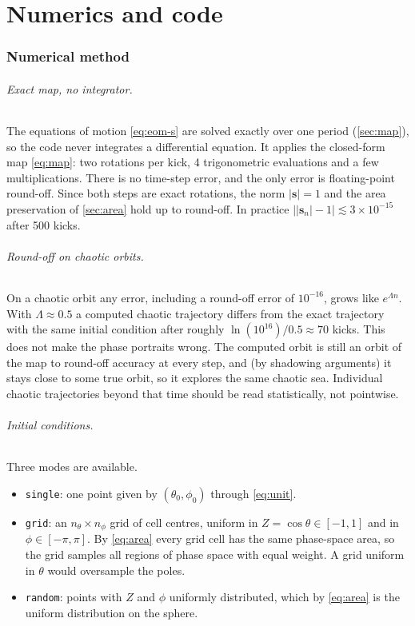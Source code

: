 \documentclass[11pt,a4paper]{article}
\newcommand{\vs}{\bm{s}}
\begin{document}
\part{Numerics and code}\label{part:numerics}

\section{Numerical method}\label{sec:method}

\paragraph{Exact map, no integrator.} The equations of motion \eqref{eq:eom-s} are solved exactly over one period
(\cref{sec:map}), so the code never integrates a differential equation. It applies the closed-form map
\eqref{eq:map}: two rotations per kick, 4 trigonometric evaluations and a few multiplications. There is no time-step
error, and the only error is floating-point round-off. Since both steps are exact rotations, the norm $|\vs| = 1$
and the area preservation of \cref{sec:area} hold up to round-off. In practice $\big||\vs_n|-1\big| \lesssim
3\times10^{-15}$ after 500 kicks.

\paragraph{Round-off on chaotic orbits.} On a chaotic orbit any error, including a round-off error of $10^{-16}$,
grows like $e^{\Lambda n}$. With $\Lambda \approx 0.5$ a computed chaotic trajectory differs from the exact trajectory
with the same initial condition after roughly $\ln(10^{16})/0.5 \approx 70$ kicks. This does not make the
phase portraits wrong. The computed orbit is still an orbit of the map to round-off accuracy at every step, and (by
shadowing arguments) it stays close to some true orbit, so it explores the same chaotic sea. Individual chaotic
trajectories beyond that time should be read statistically, not pointwise.

\paragraph{Initial conditions.} Three modes are available.
\begin{itemize}
  \item \texttt{single}: one point given by $(\theta_0, \phi_0)$ through \eqref{eq:unit}.
  \item \texttt{grid}: an $n_\theta \times n_\phi$ grid of cell centres, uniform in $Z = \cos\theta \in [-1,1]$ and
  in $\phi \in [-\pi, \pi]$. By \eqref{eq:area} every grid cell has the same phase-space area, so the grid samples all
  regions of phase space with equal weight. A grid uniform in $\theta$ would oversample the poles.
  \item \texttt{random}: points with $Z$ and $\phi$ uniformly distributed, which by \eqref{eq:area} is the uniform
  distribution on the sphere.
\end{itemize}
\end{document}
